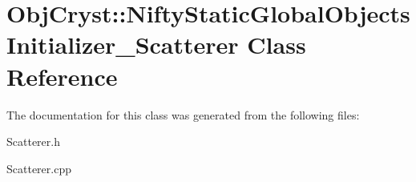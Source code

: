\hypertarget{class_obj_cryst_1_1_nifty_static_global_objects_initializer___scatterer}{}\section{Obj\+Cryst\+::Nifty\+Static\+Global\+Objects\+Initializer\+\_\+\+Scatterer Class Reference}
\label{class_obj_cryst_1_1_nifty_static_global_objects_initializer___scatterer}


The documentation for this class was generated from the following files\+:\begin{DoxyCompactItemize}
\item 
Scatterer.\+h\item 
Scatterer.\+cpp\end{DoxyCompactItemize}
